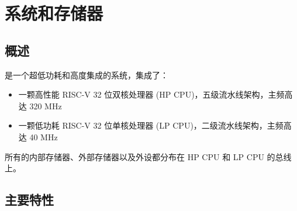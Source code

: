 \documentclass[main\_\_CN.tex]{subfiles}
\begin{document}
\setchineseformatting


\ifglobal
\else
    \clearpage
    \listoftodos
    \listofdonetodos
    \tableofcontents
\fi



\hypertarget{sysmem}{}
\chapter{系统和存储器}
\label{mod:sysmem}

\section{概述}

\chipname{} 是一个超低功耗和高度集成的系统，集成了：
\begin{itemize}
    \item 一颗高性能 RISC-V 32 位双核处理器 (HP CPU)，五级流水线架构，主频高达 320 MHz
    \item 一颗低功耗 RISC-V 32 位单核处理器 (LP CPU)，二级流水线架构，主频高达 40 MHz
\end{itemize}

所有的内部存储器、外部存储器以及外设都分布在 HP CPU 和 LP CPU 的总线上。

\section{主要特性}
\end{document}
